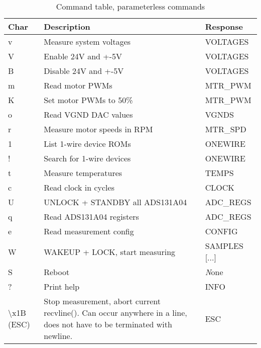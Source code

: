 \documentclass{article}
\begin{document}
\begin{table}[H]
\begin{centering}
\begin{tabular}{|p{1.0cm}|p{7.8cm}|p{2.0cm}|}
\hline
{\bf Char} & {\bf Description}    & {\bf Response}\\ \hline
v & Measure system voltages       & VOLTAGES      \\ \hline
V & Enable 24V and +-5V           & VOLTAGES      \\ \hline
B & Disable 24V and +-5V          & VOLTAGES      \\ \hline
m & Read motor PWMs               & MTR\_PWM      \\ \hline
K & Set motor PWMs to 50\%        & MTR\_PWM      \\ \hline
o & Read VGND DAC values          & VGNDS         \\ \hline
r & Measure motor speeds in RPM   & MTR\_SPD      \\ \hline
1 & List 1-wire device ROMs       & ONEWIRE       \\ \hline
! & Search for 1-wire devices     & ONEWIRE       \\ \hline
t & Measure temperatures          & TEMPS         \\ \hline
c & Read clock in cycles          & CLOCK         \\ \hline
U & UNLOCK + STANDBY all ADS131A04& ADC\_REGS     \\ \hline
q & Read ADS131A04 registers      & ADC\_REGS     \\ \hline
e & Read measurement config       & CONFIG        \\ \hline
W & WAKEUP + LOCK, start measuring& SAMPLES [...] \\ \hline
S & Reboot                        & {\emph None}  \\ \hline
? & Print help                    & INFO          \\ \hline
{\textbackslash}x1B (ESC)  &   Stop measurement, abort current recvline().
Can occur anywhere in a line, does not have to be terminated with newline. & ESC \\ \hline
\end{tabular}
\caption{Command table, parameterless commands}
\label{command_table_0}
\end{centering}
\end{table}
\end{document}
